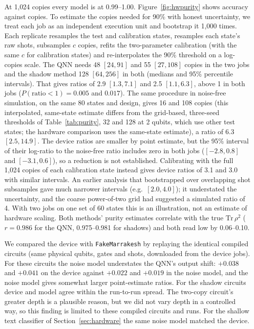 \documentclass[11pt]{article}
\begin{document}
At 1{,}024 copies every model is at 0.99--1.00. Figure~\ref{fig:hwpurity} shows accuracy against copies. To estimate the copies needed for 90\% with honest uncertainty, we treat each job as an independent execution unit and bootstrap it 1{,}000 times. Each replicate resamples the test and calibration states, resamples each state's raw shots, subsamples $c$ copies, refits the two-parameter calibration (with the same $c$ for calibration states) and re-interpolates the 90\% threshold on a log-copies scale. The QNN needs 48 $[24, 91]$ and 55 $[27, 108]$ copies in the two jobs and the shadow method 128 $[64, 256]$ in both (medians and 95\% percentile intervals). That gives ratios of 2.9 $[1.3, 7.1]$ and 2.5 $[1.1, 6.3]$, above 1 in both jobs ($P(\text{ratio}<1) = 0.005$ and $0.017$). The same procedure in noise-free simulation, on the same 80 states and design, gives 16 and 108 copies (this interpolated, same-state estimate differs from the grid-based, three-seed thresholds of Table~\ref{tab:purity}, 32 and 128 at 2 qubits, which use other test states; the hardware comparison uses the same-state estimate), a ratio of 6.3 $[2.5, 14.9]$. The device ratios are smaller by point estimate, but the 95\% interval of their log-ratio to the noise-free ratio includes zero in both jobs ($[-2.8, 0.8]$ and $[-3.1, 0.6]$), so a reduction is not established. Calibrating with the full 1{,}024 copies of each calibration state instead gives device ratios of 3.1 and 3.0 with similar intervals. An earlier analysis that bootstrapped over overlapping shot subsamples gave much narrower intervals (e.g.\ $[2.0, 4.0]$); it understated the uncertainty, and the coarse power-of-two grid had suggested a simulated ratio of 4. With two jobs on one set of 60 states this is an illustration, not an estimate of hardware scaling. Both methods' purity estimates correlate with the true $\mathrm{Tr}\,\rho^2$ ($r = 0.986$ for the QNN, 0.975--0.981 for shadows) and both read low by 0.06--0.10.

We compared the device with \texttt{FakeMarrakesh} by replaying the identical compiled circuits (same physical qubits, gates and shots, downloaded from the device jobs). For these circuits the noise model understates the QNN's output shift: $+0.038$ and $+0.041$ on the device against $+0.022$ and $+0.019$ in the noise model, and the noise model gives somewhat larger point-estimate ratios. For the shadow circuits device and model agree within the run-to-run spread. The two-copy circuit's greater depth is a plausible reason, but we did not vary depth in a controlled way, so this finding is limited to these compiled circuits and runs. For the shallow text classifier of Section~\ref{sec:hardware} the same noise model matched the device.
\end{document}
